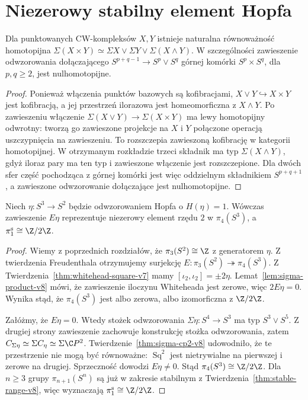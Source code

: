 \section{Niezerowy stabilny element Hopfa}
\begin{lemat}
\label{lem:sigma-product-v8}
Dla punktowanych CW-kompleksów $X,Y$ istnieje naturalna
równoważność homotopijna
$\Sigma(X\times Y)\simeq
\Sigma X\vee\Sigma Y\vee\Sigma(X\wedge Y)$.
W szczególności zawieszenie odwzorowania dołączającego
$S^{p+q-1}\to S^p\vee S^q$ górnej komórki
$S^p\times S^q$, dla $p,q\ge2$, jest nulhomotopijne.
\end{lemat}
\begin{proof}
Ponieważ włączenia punktów bazowych są kofibracjami,
$X\vee Y\hookrightarrow X\times Y$ jest kofibracją,
a jej przestrzeń ilorazowa jest homeomorficzna z
$X\wedge Y$.
Po zawieszeniu włączenie
$\Sigma(X\vee Y)\to\Sigma(X\times Y)$
ma lewy homotopijny odwrotny: tworzą go zawieszone
projekcje na $X$ i $Y$ połączone operacją uszczypnięcia
na zawieszeniu. To rozszczepia zawieszoną kofibrację
w kategorii homotopijnej. W otrzymanym rozkładzie
trzeci składnik ma typ $\Sigma(X\wedge Y)$,
gdyż iloraz pary ma ten typ i zawieszone włączenie
jest rozszczepione. Dla dwóch sfer część pochodząca
z górnej komórki jest więc oddzielnym składnikiem
$S^{p+q+1}$, a zawieszone odwzorowanie dołączające jest
nulhomotopijne.
\end{proof}

\begin{twierdzenie}
\label{thm:stable-eta-v8}
Niech $\eta:S^3\to S^2$ będzie odwzorowaniem Hopfa o
$H(\eta)=1$. Wówczas zawieszenie $E\eta$
reprezentuje niezerowy element rzędu $2$ w
$\pi_4(S^3)$, a
$\pi_1^{\mathrm s}\cong\Z/2\Z$.
\end{twierdzenie}
\begin{proof}
Wiemy z poprzednich rozdziałów, że
$\pi_3(S^2)\cong\Z$ z generatorem $\eta$.
Z twierdzenia Freudenthala otrzymujemy surjekcję
$E:\pi_3(S^2)\twoheadrightarrow\pi_4(S^3)$.
Z Twierdzenia~\ref{thm:whitehead-square-v7} mamy
$[\iota_2,\iota_2]=\pm2\eta$.
Lemat~\ref{lem:sigma-product-v8} mówi, że zawieszenie
iloczynu Whiteheada jest zerowe, więc $2E\eta=0$.
Wynika stąd, że $\pi_4(S^3)$ jest albo zerowa,
albo izomorficzna z $\Z/2\Z$.

Załóżmy, że $E\eta=0$. Wtedy stożek odwzorowania
$\Sigma\eta:S^4\to S^3$ ma typ
$S^3\vee S^5$. Z drugiej strony zawieszenie zachowuje
konstrukcję stożka odwzorowania, zatem
$C_{\Sigma\eta}\simeq\Sigma C_\eta
\simeq\Sigma\C P^2$.
Twierdzenie~\ref{thm:sigma-cp2-v8} udowodniło,
że te przestrzenie nie mogą być równoważne:
$\operatorname{Sq}^2$ jest nietrywialne na pierwszej
i zerowe na drugiej. Sprzeczność dowodzi $E\eta\ne0$.
Stąd $\pi_4(S^3)\cong\Z/2\Z$.
Dla $n\ge3$ grupy $\pi_{n+1}(S^n)$ są już w zakresie
stabilnym z Twierdzenia~\ref{thm:stable-range-v8},
więc wyznaczają $\pi_1^{\mathrm s}\cong\Z/2\Z$.
\end{proof}

